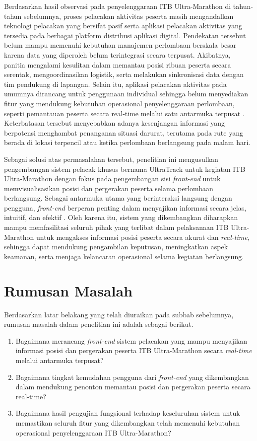Berdasarkan hasil observasi pada penyelenggaraan ITB Ultra-Marathon di tahun-tahun sebelumnya, proses pelacakan aktivitas peserta masih mengandalkan teknologi pelacakan yang bersifat pasif serta aplikasi pelacakan aktivitas yang tersedia pada berbagai platform distribusi aplikasi digital. Pendekatan tersebut belum mampu memenuhi kebutuhan manajemen perlombaan berskala besar karena data yang diperoleh belum terintegrasi secara terpusat. Akibatnya, panitia mengalami kesulitan dalam memantau posisi ribuan peserta secara serentak, mengoordinasikan logistik, serta melakukan sinkronisasi data dengan tim pendukung di lapangan. Selain itu, aplikasi pelacakan aktivitas pada umumnya dirancang untuk penggunaan individual sehingga belum menyediakan fitur yang mendukung kebutuhan operasional penyelenggaraan perlombaan, seperti pemantauan peserta secara real-time melalui satu antarmuka terpusat \cite{higgins2016smartphone}. Keterbatasan tersebut menyebabkan adanya kesenjangan informasi yang berpotensi menghambat penanganan situasi darurat, terutama pada rute yang berada di lokasi terpencil atau ketika perlombaan berlangsung pada malam hari.

Sebagai solusi atas permasalahan tersebut, penelitian ini mengusulkan pengembangan sistem pelacak khusus bernama UltraTrack untuk kegiatan ITB Ultra-Marathon dengan fokus pada pengembangan sisi \textit{front-end} untuk memvisualisasikan posisi dan pergerakan peserta selama perlombaan berlangsung. Sebagai antarmuka utama yang berinteraksi langsung dengan pengguna, \textit{front-end} berperan penting dalam menyajikan informasi secara jelas, intuitif, dan efektif \cite{Caselli2018}. Oleh karena itu, sistem yang dikembangkan diharapkan mampu memfasilitasi seluruh pihak yang terlibat dalam pelaksanaan ITB Ultra-Marathon untuk mengakses informasi posisi peserta secara akurat dan \textit{real-time}, sehingga dapat mendukung pengambilan keputusan, meningkatkan aspek keamanan, serta menjaga kelancaran operasional selama kegiatan berlangsung.

\section{Rumusan Masalah}
Berdasarkan latar belakang yang telah diuraikan pada subbab sebelumnya, rumusan masalah dalam penelitian ini adalah sebagai berikut.
\begin{enumerate}
    \item Bagaimana merancang \textit{front-end} sistem pelacakan yang mampu menyajikan informasi posisi dan pergerakan peserta ITB Ultra-Marathon secara \textit{real-time} melalui antarmuka terpusat?
    \item Bagaimana tingkat kemudahan pengguna dari \textit{front-end} yang dikembangkan dalam mendukung penonton memantau posisi dan pergerakan peserta secara real-time?
    \item Bagaimana hasil pengujian fungsional terhadap keseluruhan sistem untuk memastikan seluruh fitur yang dikembangkan telah memenuhi kebutuhan operasional penyelenggaraan ITB Ultra-Marathon?
\end{enumerate}
